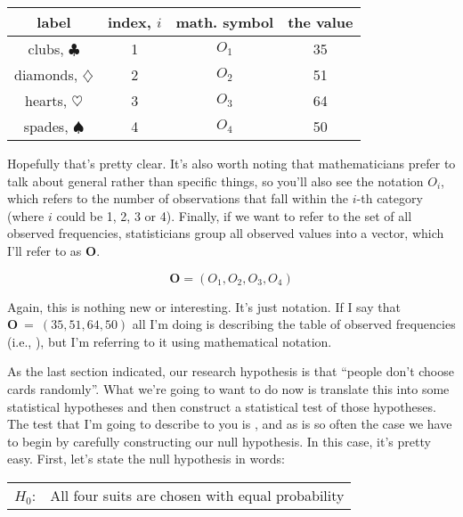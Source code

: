 \begin{center}
\begin{tabular}{cc|cc}
label &  index, $i$  & math. symbol &  the value \\  \hline
 clubs, $\clubsuit$ 	& 1 	& $O_1$ & 35 \\
 diamonds, $\diamondsuit$ & 2& $O_2$ & 51 \\
 hearts, $\heartsuit$	&3	& $O_3$ & 64 \\
 spades, $\spadesuit$ &4		& $O_4$ & 50 \\
\end{tabular}
\end{center}

\noindent
Hopefully that's pretty clear. It's also worth noting that mathematicians prefer to talk about general rather than specific things, so you'll also see the notation $O_i$, which refers to the number of observations that fall within the $i$-th category (where $i$ could be 1, 2, 3 or 4). Finally, if we want to refer to the set of all observed frequencies, statisticians group all observed values into a vector, which I'll refer to as $\bm{O}$. 

$$
\bm{O} = (O_1, O_2, O_3, O_4)
$$

Again, this is nothing new or interesting. It's just notation. If I say that $\bm{O}~=~(35, 51, 64, 50)$ all I'm doing is describing the table of observed frequencies (i.e., ), but I'm referring to it using mathematical notation. 


As the last section indicated, our research hypothesis is that ``people don't choose cards randomly''. What we're going to want to do now is translate this into some statistical hypotheses and then construct a statistical test of those hypotheses. The test that I'm going to describe to you is , and as is so often the case we have to begin by carefully constructing our null hypothesis. In this case, it's pretty easy. First, let's state the null hypothesis in words:

\smallskip
\begin{tabular}{ll}
$H_0$: \hspace*{0.5cm} & All four suits are chosen with equal probability
\end{tabular} 
\smallskip

